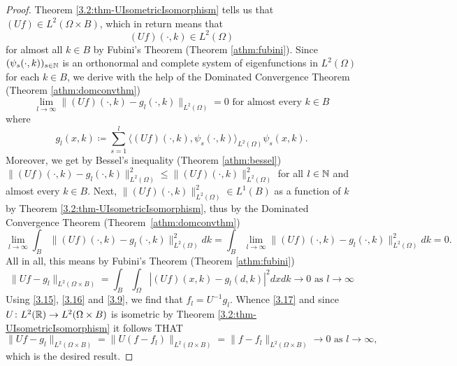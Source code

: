 \begin{theorem}
	\begin{proof}
		Theorem \ref{3.2:thm-UIsometricIsomorphism} tells us that $(Uf) \in L^{2}(\Omega \times B)$, which in return means that 
		\[ (Uf)(\cdot, k) \in L^{2}(\Omega) \]
		 for almost all $k \in B$ by Fubini's Theorem (Theorem \ref{athm:fubini}). Since $(\psi_{s}(\cdot, k))_{s \in \mathbb{N}}$ is an orthonormal and complete system of eigenfunctions in $L^{2}(\Omega)$ for each $k \in B$, we derive with the help of the Dominated Convergence Theorem (Theorem \ref{athm:domconvthm})
			\[ \lim_{l \rightarrow \infty} \| (Uf)(\cdot, k) - g_{l}(\cdot, k) \|_{L^{2}(\Omega)} = 0 \text{ for almost every } k \in B \]
		where 
			\begin{equation}
				g_{l}(x, k) \coloneqq \sum_{s=1}^{l} \langle(Uf)(\cdot, k), \psi_{s}(\cdot,k)\rangle_{L^{2}(\Omega)} \psi_{s}(x,k). \label{3.16}
			\end{equation}
		Moreover, we get by Bessel's inequality (Theorem \ref{athm:bessel}) $\| (Uf)(\cdot, k) - g_{l}(\cdot, k) \|^{2}_{L^{2}(\Omega)} \leq \| (Uf)(\cdot, k) \|^{2}_{L^{2}(\Omega)}$ for all $l \in \mathbb{N}$ and almost every $k \in B$. Next, $\|(Uf)(\cdot, k)\|^{2}_{L^{2}(\Omega)} \in L^{1}(B)$ as a function of $k$ by Theorem \ref{3.2:thm-UIsometricIsomorphism}, thus by the Dominated Convergence Theorem (Theorem \ref{athm:domconvthm})
		\[ \lim_{l \rightarrow \infty} \int_{B} \| (Uf)(\cdot, k) - g_{l}(\cdot, k) \|^{2}_{L^{2}(\Omega)} dk  = \int_{B} \lim_{l \rightarrow \infty}  \| (Uf)(\cdot, k) - g_{l}(\cdot, k) \|^{2}_{L^{2}(\Omega)} dk = 0. \]
		  All in all, this means by Fubini's Theorem (Theorem \ref{athm:fubini})
			\begin{equation}
				\| U f - g_{l} \|_{L^{2}(\Omega \times B)} = \int_{B} \int_{\Omega} \left| (Uf)(x, k) - g_{l}(d, k) \right|^{2} dx dk \rightarrow 0 \text{ as } l \rightarrow \infty \label{3.17}
			\end{equation} 
		 Using \eqref{3.15}, \eqref{3.16} and \eqref{3.9}, we find that $f_{l} = U^{-1}g_{l}$. Whence \eqref{3.17} and since $U \colon L^{2}(\mathbb{R}) \rightarrow L^{2}(\Omega \times B)$ is isometric by Theorem \ref{3.2:thm-UIsometricIsomorphism} it follows THAT
			\[ \| U f - g_{l} \|_{L^{2}(\Omega \times B)} = \| U(f - f_{l}) \|_{L^{2}(\Omega \times B)} = \| f - f_{l} \|_{L^{2}(\Omega \times B)} \rightarrow 0 \text{ as } l \rightarrow \infty,\]
		 which is the desired result.
	\end{proof}
\end{theorem}